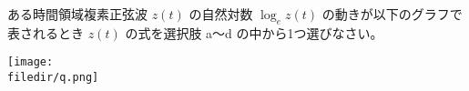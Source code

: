 ある時間領域複素正弦波  $z(t)$ の自然対数 $\log_e z(t)$ の動きが以下のグラフで表されるとき $z(t)$ の式を選択肢 a〜d の中から1つ選びなさい。

\centering\texttt{[image: \\filedir/q.png]}
